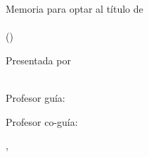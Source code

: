 
\begin{titlepage}
    \centering
    
    
    \vspace*{1.5cm}
    
    {\Large \Institucion\par}
    \vspace{0.2cm}
    {\large \Departamento\par}
    
    \vspace{3cm}
    
    {\LARGE\bfseries \TituloMemoria\par}
    
    \vspace{2cm}
    
    {\large Memoria para optar al título de}\\[0.4cm]
    {\large\bfseries \GradoQueOpta}\\
    \vspace{0.2cm}
    {\large (\Carrera)}\\
    
    \vspace{2.5cm}
    
    {\large Presentada por}\\[0.4cm]
    {\large\bfseries \AutorNombre}\\
    
    \vspace{1.5cm}
    
    {\large Profesor guía: \ProfesorGuia\par}
    {\large Profesor co-guía: \ProfesorCoguia\par}
    
    \vfill
    
    {\large \Ciudad, \Anio\par}
    
\end{titlepage}
